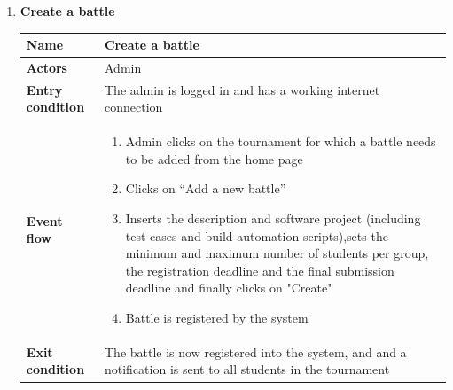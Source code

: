 \documentclass{article}
\begin{document}
\begin{enumerate}[label=\textbf{UC\arabic*}:]
        \item \textbf{Create a battle}
    \begin{center}
        \begin{tabular}{ | m{8em} | m{10cm}|  } 
            \hline 
            \textbf{Name} & Create a battle\\[1ex] 
            \hline 
            \textbf{Actors} & Admin \\[1ex] 
            \hline 
            \textbf{Entry condition} & The admin is logged in and has a working internet connection  \\[1ex] 
            \hline 
            \textbf{Event flow} & \begin{enumerate}[label=\textbf{\arabic*}:]
                \item Admin clicks on the tournament for which a battle needs to be added from the home page
                \item Clicks on “Add a new battle”
                \item Inserts the description and software project (including test cases and build automation scripts),sets the minimum and maximum number of students per group, the registration deadline and the final submission deadline and finally clicks on "Create"
                \item Battle is registered by the system
            \end{enumerate} \\[1ex]
            \hline 
            \textbf{Exit condition} & The battle is now registered into the system, and  and a notification is sent to all students in the tournament\\[1ex]
            \hline 
    

\end{tabular}
\end{center}
\end{enumerate}
\end{document}
